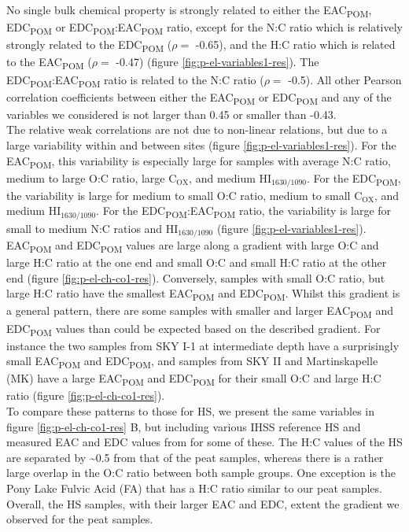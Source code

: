 \documentclass[alpha-refs, lineno]{wiley-article-rmd}
\begin{document}
No single bulk chemical property is strongly related to either the EAC\textsubscript{POM}, EDC\textsubscript{POM} or EDC\textsubscript{POM}:EAC\textsubscript{POM} ratio, except for the N:C ratio which is relatively strongly related to the EDC\textsubscript{POM} (\(\rho=\) -0.65), and the H:C ratio which is related to the EAC\textsubscript{POM} (\(\rho=\) -0.47) (figure \ref{fig:p-el-variables1-res}). The EDC\textsubscript{POM}:EAC\textsubscript{POM} ratio is related to the N:C ratio (\(\rho=\) -0.5). All other Pearson correlation coefficients between either the EAC\textsubscript{POM} or EDC\textsubscript{POM} and any of the variables we considered is not larger than 0.45 or smaller than -0.43.\\
The relative weak correlations are not due to non-linear relations, but due to a large variability within and between sites (figure \ref{fig:p-el-variables1-res}). For the EAC\textsubscript{POM}, this variability is especially large for samples with average N:C ratio, medium to large O:C ratio, large C\(_\text{OX}\), and medium HI\(_\text{1630/1090}\). For the EDC\textsubscript{POM}, the variability is large for medium to small O:C ratio, medium to small C\(_\text{OX}\), and medium HI\(_\text{1630/1090}\). For the EDC\textsubscript{POM}:EAC\textsubscript{POM} ratio, the variability is large for small to medium N:C ratios and HI\(_\text{1630/1090}\) (figure \ref{fig:p-el-variables1-res}).\\
EAC\textsubscript{POM} and EDC\textsubscript{POM} values are large along a gradient with large O:C and large H:C ratio at the one end and small O:C and small H:C ratio at the other end (figure \ref{fig:p-el-ch-co1-res}). Conversely, samples with small O:C ratio, but large H:C ratio have the smallest EAC\textsubscript{POM} and EDC\textsubscript{POM}. Whilst this gradient is a general pattern, there are some samples with smaller and larger EAC\textsubscript{POM} and EDC\textsubscript{POM} values than could be expected based on the described gradient. For instance the two samples from SKY I-1 at intermediate depth have a surprisingly small EAC\textsubscript{POM} and EDC\textsubscript{POM}, and samples from SKY II and Martinskapelle (MK) have a large EAC\textsubscript{POM} and EDC\textsubscript{POM} for their small O:C and large H:C ratio (figure \ref{fig:p-el-ch-co1-res}).\\
To compare these patterns to those for HS, we present the same variables in figure \ref{fig:p-el-ch-co1-res} B, but including various IHSS reference HS and measured EAC and EDC values from \textcite{Aeschbacher.2012} for some of these. The H:C values of the HS are separated by \textasciitilde0.5 from that of the peat samples, whereas there is a rather large overlap in the O:C ratio between both sample groups. One exception is the Pony Lake Fulvic Acid (FA) that has a H:C ratio similar to our peat samples. Overall, the HS samples, with their larger EAC and EDC, extent the gradient we observed for the peat samples.
\end{document}
